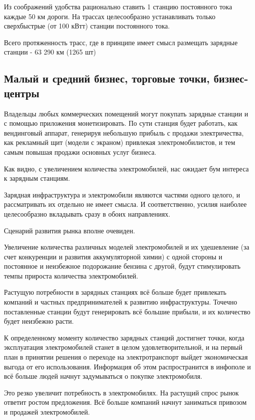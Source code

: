\documentclass[a4paper,12pt]{report}
\begin{document}
Из соображений удобства рационально ставить 1 станцию постоянного тока каждые 50 км дороги. На трассах целесообразно устанавливать только сверхбыстрые (от 100 кВтт) станции постоянного тока. 

Всего протяженность трасс, где в принципе имеет смысл размещать зарядные станции  - 63 290 км (1265 шт)

\subsection{Малый и средний бизнес, торговые точки, бизнес-центры}

Владельцы любых коммерческих помещений могут покупать зарядные станции и с помощью приложения монетизировать. По сути станция будет работать, как вендинговый аппарат, генерируя небольшую прибыль с продажи электричества, как рекламный щит (модели с экраном) привлекая электромобилистов, и тем самым повышая продажи основных услуг бизнеса. 

Как видно, с увеличением количества электромобилей, нас ожидает бум интереса к зарядным станциям. 

Зарядная инфраструктура и электромобили являются частями одного целого, и рассматривать их отдельно не имеет смысла. И соответственно, усилия наиболее целесообразно вкладывать сразу в обоих направлениях.  

Сценарий развития рынка вполне очевиден. 

Увеличение количества различных моделей электромобилей и их удешевление (за счет конкуренции и развития аккумуляторной химии) с одной стороны и постоянное и неизбежное подорожание бензина с другой, будут стимулировать темпы прироста количества электромобилей. 

Растущую потребности в зарядных станциях всё больше будет привлекать компаний и частных предпринимателей к развитию инфраструктуры. Точечно поставленные станции будут генерировать всё большие прибыли, и их количество будет неизбежно расти. 

К определенному моменту количество зарядных станций достигнет точки, когда эксплуатация электромобилей станет в целом удовлетворительной, и на первый план в принятии решения о переходе на электротранспорт выйдет экономическая выгода от его использования. Информация об этом распространится в инфополе и всё больше людей начнут задумываться о покупке электромобиля.

Это резко увеличит потребность в электромобилях. На растущий спрос рынок ответит ростом предложения. Всё больше компаний начнут заниматься привозом и продажей электромобилей. 
\end{document}
